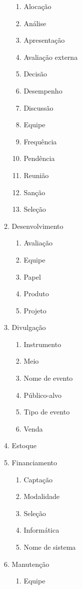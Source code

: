 \begin{multicols}{2}
\begin{itemize}
\begin{enumerate}
\begin{enumerate}
					\item Alocação		
					\item Análise		
					\item Apresentação		
					\item Avaliação externa		
					\item Decisão		
					\item Desempenho		
					\item Discussão		
					\item Equipe		
					\item Frequência		
					\item Pendência		
					\item Reunião		
					\item Sanção		
					\item Seleção	\end{enumerate}	
			\item Desenvolvimento	\begin{enumerate}			
					\item Avaliação		
					\item Equipe		
					\item Papel		
					\item Produto		
					\item Projeto	\end{enumerate}	
			\item Divulgação	\begin{enumerate}			
					\item Instrumento		
					\item Meio		
					\item Nome de evento		
					\item Público-alvo		
					\item Tipo de evento		
					\item Venda	\end{enumerate}	
			\item Estoque				
			\item Financiamento	\begin{enumerate}			
					\item Captação		
					\item Modalidade		
					\item Seleção		
			\item Informática		\item Nome de sistema	\end{enumerate}	
			\item Manutenção	\begin{enumerate}			
					\item Equipe	\end{enumerate}	

\end{enumerate}
\end{itemize}
\end{multicols}
